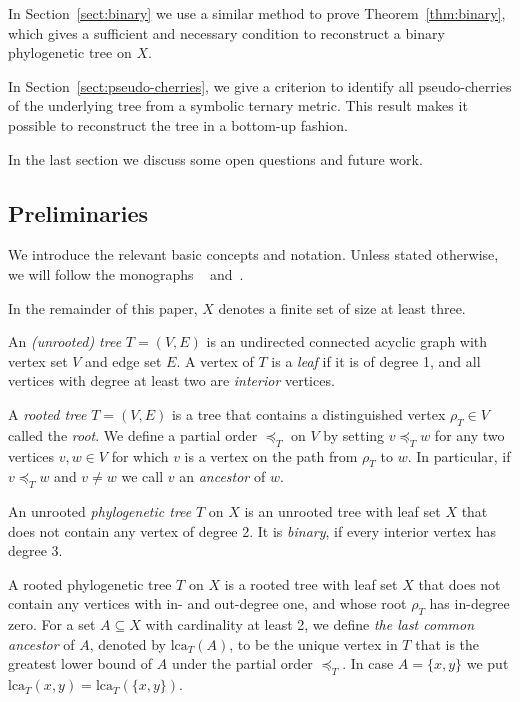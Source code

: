 \documentclass{article}
\newcommand{\TODO}[1]{\begingroup\color{red}#1\endgroup}
\begin{document}
In Section~\ref{sect:binary} we use a similar method to prove 
Theorem~\ref{thm:binary}, which gives
a sufficient and necessary condition to reconstruct a binary phylogenetic tree on 
$X$.

In Section~\ref{sect:pseudo-cherries}, we give a criterion to identify 
all pseudo-cherries of the underlying tree from a symbolic ternary metric.  
This result makes it possible to reconstruct the tree in 
a bottom-up fashion. 

In the last section we discuss some open questions and future work.

\subsection{Preliminaries}
\label{sect:prelim}

We introduce the relevant basic concepts and 
notation. Unless 
stated otherwise, we will follow the monographs ~\cite{Semple2003} and~\cite{Dress2012}.

In the remainder of this paper, $X$ denotes a finite set of size at least three.


An \textit{(unrooted) tree} $T=(V,E)$ is an undirected connected acyclic graph with 
vertex 
set $V$ and edge set $E$. A vertex of $T$ is a \textit{leaf}
if it is of degree 1, and all vertices with 
degree at least two are \textit{interior} vertices. 

A \textit{rooted tree} $T=(V,E)$ is a tree that contains a distinguished vertex 
$\rho_T \in V$ called the \textit{root}. We define a partial order $\preceq_T$
on $V$ by setting $v\preceq_T w$ for any two vertices $v,w\in V$ for which $v$
is a vertex on the path from $\rho_T$ to $w$. In particular, if $v\preceq_T w$
and $v\neq w$
we call $v$ an \textit{ancestor} of $w$. 



An unrooted \textit{phylogenetic tree} $T$ on $X$ is an unrooted tree with 
leaf 
set $X$ that does not contain any vertex of degree 2. It is \textit{binary}, if 
every interior vertex has degree 3.


A rooted phylogenetic tree $T$ on $X$ is a rooted tree with leaf set $X$ that 
does not contain any vertices with in- and out-degree one,
and whose root $\rho_T$ has in-degree zero.
For a set $A\subseteq X$ with cardinality at least 2, we define \textit{the last common 
ancestor} of $A$, denoted by $\text{lca}_T(A)$, to be the unique vertex in $T$
that is the greatest lower bound of $A$ under the partial order $\preceq_T$.
In case $A=\{x,y\}$ we put $\text{lca}_T(x,y) = \text{lca}_T(\{x,y\})$.
\end{document}
